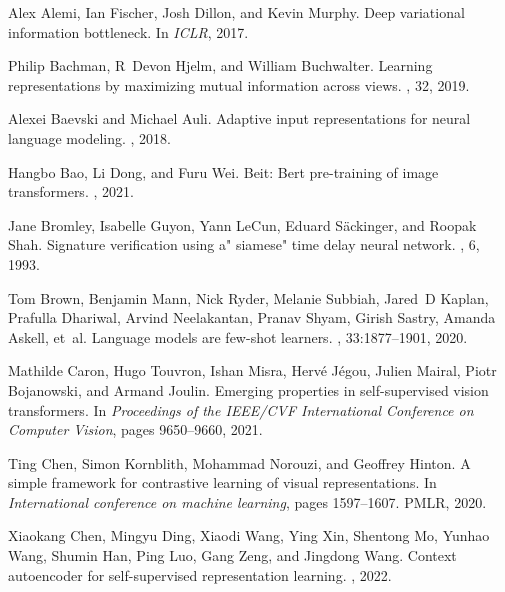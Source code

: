 \documentclass[10pt,twocolumn,letterpaper]{article}
\begin{document}
\begin{thebibliography}{10}\itemsep=-1pt
	
	Alex Alemi, Ian Fischer, Josh Dillon, and Kevin Murphy.
	\newblock Deep variational information bottleneck.
	\newblock In {\em ICLR}, 2017.
	
	Philip Bachman, R~Devon Hjelm, and William Buchwalter.
	\newblock Learning representations by maximizing mutual information across
	views.
	, 32, 2019.
	
	Alexei Baevski and Michael Auli.
	\newblock Adaptive input representations for neural language modeling.
	, 2018.
	
	Hangbo Bao, Li Dong, and Furu Wei.
	\newblock Beit: Bert pre-training of image transformers.
	, 2021.
	
	Jane Bromley, Isabelle Guyon, Yann LeCun, Eduard S{\"a}ckinger, and Roopak
	Shah.
	\newblock Signature verification using a" siamese" time delay neural network.
	, 6, 1993.
	
	Tom Brown, Benjamin Mann, Nick Ryder, Melanie Subbiah, Jared~D Kaplan, Prafulla
	Dhariwal, Arvind Neelakantan, Pranav Shyam, Girish Sastry, Amanda Askell,
	et~al.
	\newblock Language models are few-shot learners.
	,
	33:1877--1901, 2020.
	
	Mathilde Caron, Hugo Touvron, Ishan Misra, Herv{\'e} J{\'e}gou, Julien Mairal,
	Piotr Bojanowski, and Armand Joulin.
	\newblock Emerging properties in self-supervised vision transformers.
	\newblock In {\em Proceedings of the IEEE/CVF International Conference on
		Computer Vision}, pages 9650--9660, 2021.
	
	Ting Chen, Simon Kornblith, Mohammad Norouzi, and Geoffrey Hinton.
	\newblock A simple framework for contrastive learning of visual
	representations.
	\newblock In {\em International conference on machine learning}, pages
	1597--1607. PMLR, 2020.
	
	Xiaokang Chen, Mingyu Ding, Xiaodi Wang, Ying Xin, Shentong Mo, Yunhao Wang,
	Shumin Han, Ping Luo, Gang Zeng, and Jingdong Wang.
	\newblock Context autoencoder for self-supervised representation learning.
	, 2022.
	

\end{thebibliography}
\end{document}
